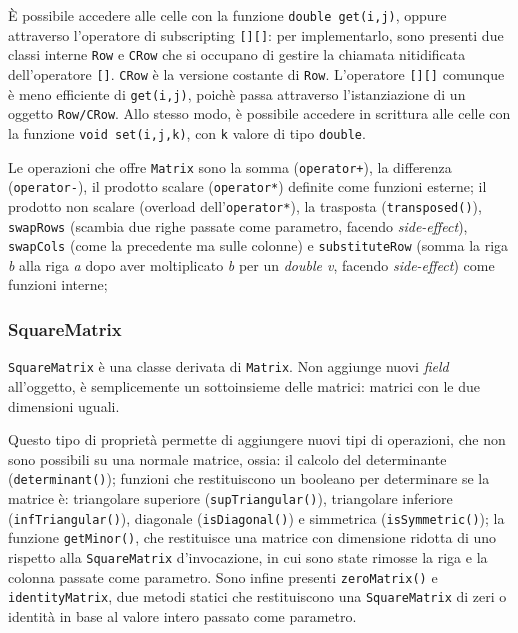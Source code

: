 È possibile accedere alle celle con la funzione \texttt{double get(i,j)}, 
oppure attraverso l'operatore di subscripting \texttt{[][]}: per implementarlo, sono presenti due classi interne
\texttt{Row} e \texttt{CRow} che si occupano di gestire la chiamata nitidificata dell'operatore 
\texttt{[]}. \texttt{CRow} è la versione costante di \texttt{Row}. L'operatore \texttt{[][]} comunque è meno
efficiente di \texttt{get(i,j)}, poichè passa attraverso l'istanziazione di un oggetto \texttt{Row/CRow}.
Allo stesso modo, è possibile accedere in scrittura alle celle con la funzione \mbox{\texttt{void set(i,j,k)}}, con 
\texttt{k} valore di tipo \texttt{double}.

Le operazioni che offre \texttt{Matrix} sono
la somma (\texttt{operator+}), la differenza (\texttt{operator-}), il prodotto scalare (\texttt{operator*})
definite come funzioni esterne; il prodotto non scalare (overload dell'\texttt{operator*}), la trasposta (\texttt{transposed()}), \texttt{swapRows} 
(scambia due righe passate come parametro, facendo \emph{side-effect}), \texttt{swapCols} (come la precedente 
ma sulle colonne) e \texttt{substituteRow} (somma la riga \emph{b} alla riga \emph{a} dopo aver moltiplicato 
\emph{b} per un \emph{double v}, facendo \emph{side-effect}) come funzioni interne;

\subsubsection{SquareMatrix} 
\texttt{SquareMatrix} è una classe derivata di \texttt{Matrix}. Non aggiunge nuovi \emph{field} all'oggetto,
è semplicemente un sottoinsieme delle matrici: matrici con le due dimensioni uguali.\par
Questo tipo di proprietà permette di aggiungere nuovi tipi di operazioni, che non sono possibili su una
normale matrice, ossia: il calcolo del determinante (\texttt{determinant()}); funzioni che restituiscono un 
booleano per determinare se la matrice è: triangolare superiore (\texttt{supTriangular()}), triangolare 
inferiore (\texttt{infTriangular()}), diagonale (\texttt{isDiagonal()}) e simmetrica (\texttt{isSymmetric()});
la funzione \texttt{getMinor()}, che restituisce una matrice con dimensione ridotta di uno rispetto alla 
\texttt{SquareMatrix} d'invocazione, in cui sono state rimosse la riga e la colonna passate come parametro. Sono infine presenti
\texttt{zeroMatrix()} e \texttt{identityMatrix}, due metodi statici che restituiscono una \texttt{SquareMatrix} di zeri o identità in 
base al valore intero passato come parametro.

